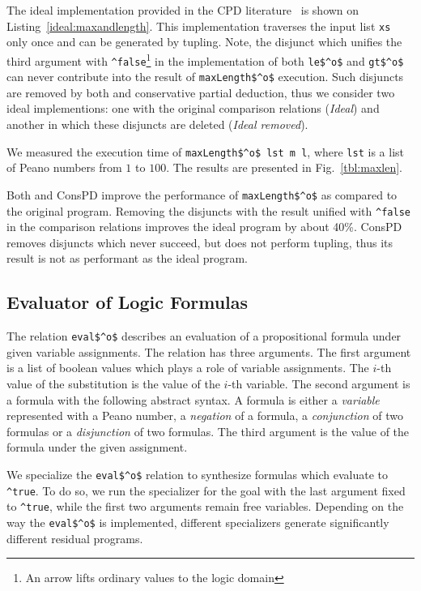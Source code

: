 The ideal implementation provided in the CPD literature~\cite{de1999conjunctive} is shown on Listing~\ref{ideal:maxandlength}.
This implementation traverses the input list \lstinline{xs} only once and can be generated by tupling.
Note, the disjunct which unifies the third argument with \lstinline{^false}\footnote{An arrow lifts ordinary values to the logic domain} in the implementation of both \lstinline{le$^o$} and \lstinline{gt$^o$} can never contribute into the result of \lstinline{maxLength$^o$} execution.
Such disjuncts are removed by both \ecce and conservative partial deduction, thus we consider two ideal implementions: one with the original comparison relations (\emph{Ideal}) and another in which these disjuncts are deleted (\emph{Ideal removed}).

We measured the execution time of \lstinline{maxLength$^o$ lst m l}, where \lstinline{lst} is a list of Peano numbers from $1$ to $100$.
The results are presented in Fig.~\ref{tbl:maxlen}.

Both \ecce and ConsPD improve the performance of \lstinline{maxLength$^o$} as compared to the original program.
Removing the disjuncts with the result unified with \lstinline{^false} in the comparison relations improves the ideal program by about 40\%.
ConsPD removes disjuncts which never succeed, but does not perform tupling, thus its result is not as performant as the ideal program.


\subsection{Evaluator of Logic Formulas}

The relation \lstinline{eval$^o$} describes an evaluation of a propositional formula under given variable assignments.
The relation has three arguments. The first argument is a list of boolean values which plays a role of variable assignments.
The $i$-th value of the substitution is the value of the $i$-th variable.
The second argument is a formula with the following abstract syntax.
A formula is either a \emph{variable} represented with a Peano number, a \emph{negation} of a formula, a \emph{conjunction} of two formulas or a \emph{disjunction} of two formulas.
The third argument is the value of the formula under the given assignment.

We specialize the \lstinline{eval$^o$} relation to synthesize formulas which evaluate to \lstinline{^true}.
To do so, we run the specializer for the goal with the last argument fixed to \lstinline{^true}, while the first two arguments remain free variables.
Depending on the way the \lstinline{eval$^o$} is implemented, different specializers generate significantly different residual programs.

